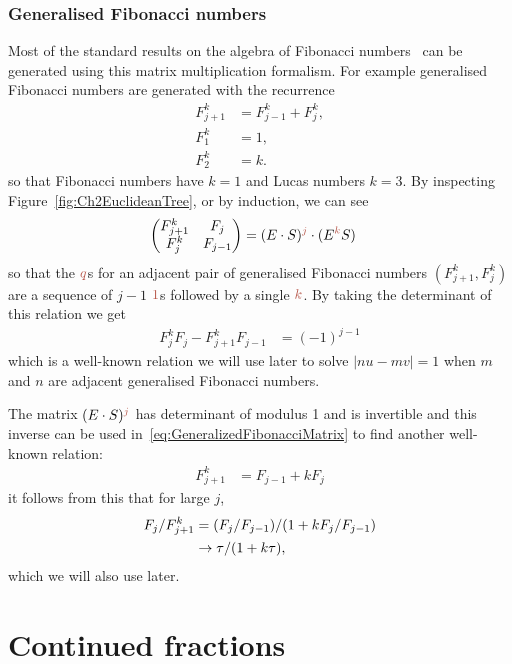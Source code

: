 \subsubsection{Generalised Fibonacci numbers}
Most of the standard results on the algebra of Fibonacci numbers~\cite{koshyFibonacciLucasNumbers2001,dunlapGoldenRatioFibonacci1997,coxeterIntroductionGeometry1989} can be generated using this matrix multiplication formalism. For example
generalised Fibonacci numbers are generated with the  recurrence
\begin{align}
	\label{eq:GeneralisedF}
		F^k_{j+1} &=  F^k_{j-1}+  F^k_{j}, \\
		F^k_1&=1,\\
		F^k_2&=k.
\end{align}
so that Fibonacci numbers have $k=1$ and Lucas numbers $k=3$. By inspecting Figure~\ref{fig:Ch2EuclideanTree}, or by induction, we can see
\begin{align}
	\begin{pmatrix} 
		F^k_{j+1} & F_j 
		\\
		F^k_j & F_{j-1}
	\end{pmatrix} &= 	(E\cdot  S)^{\jqn{j}} \cdot  (E^{\jqn{k}} S) 
\label{eq:GeneralizedFibonacciMatrix}
\end{align}
so that the $\jq$s for an adjacent pair of generalised Fibonacci numbers  $(F^k_{j+1},F^k_j)$ are a sequence of $j-1$ $\jqn{1}$s followed by a single $\jqn{k}$.
By taking the determinant of this relation we get 
\begin{align}
	F^k_j F_j - F^k_{j+1} F_{j-1} &= (-1)^{j-1} \label{eq:fkwinding}
\end{align}
which is a well-known relation 
we will use later to solve $|nu-mv|=1$ when $m$ and $n$ are adjacent generalised Fibonacci numbers.

 The matrix $(E\cdot S)^\jqn{j}$ has determinant of modulus 1 and is invertible and this inverse can be used in~\eqref{eq:GeneralizedFibonacciMatrix} to find another well-known relation:
\begin{align}
	   F^k_{j+1} &=  F_{j-1} + k F_j
\end{align}
it follows from this that for large $j$, 
\begin{align}
	F_j/F^k_{j+1}&=(F_j/F_{j-1}) / (1+k F_j/F_{j-1})
	\\
	&\rightarrow \tau/(1+k\tau)
	,
\end{align} which we will also use later.

\section{Continued fractions}


